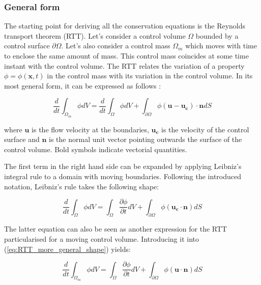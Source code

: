 \subsubsection*{General form}

The starting point for deriving all the conservation equations is the Reynolds transport theorem (RTT). Let's consider a control volume $\Omega$ bounded by a control surface $\partial \Omega$. Let's also consider a control mass $\Omega_m$ which moves with time to enclose the same amount of mass. This control mass coincides at some time instant with the control volume. The RTT relates the variation of a property $\phi = \phi \left( \boldsymbol{x}, t \right)$ in the control mass with its variation in the control volume. In its most general form, it can be expressed as follows :

\begin{equation}
\label{eq:RTT_more_general_shape}
\frac{d}{dt} \int_{\Omega_m} \phi  dV =  \frac{ d}{dt} \int_\Omega \phi dV + \int_{\partial \Omega} \phi  \left( \boldsymbol{u} - \boldsymbol{u_c} \right) \cdot \boldsymbol{n}  dS
\end{equation}

where $\boldsymbol{u}$ is the flow velocity at the boundaries, $\boldsymbol{u_c}$ is the velocity of the control surface and $\boldsymbol{n}$ is the normal unit vector pointing outwards the surface of the control volume. Bold symbols indicate vectorial quantities. 

The first term in the right hand side can be expanded by applying Leibniz's integral rule to a domain with moving boundaries. Following the introduced notation, Leibniz's rule takes the following shape:

\begin{equation}
\label{eq:reynolds_transport_theorem_general_controlVolume}
\frac{d}{dt} \int_\Omega \phi dV =  \int_\Omega \frac{\partial \phi}{\partial t} dV + \int_{\partial \Omega} \phi \left( \boldsymbol{u_c} \cdot \boldsymbol{n} \right) dS
\end{equation}

The latter equation can also be seen as another expression for the RTT particularised for a moving control volume. Introducing it into (\ref{eq:RTT_more_general_shape}) yields:


\begin{equation}
\label{eq:reynolds_transport_theorem_general_controlMass}
\boxed{
\frac{d}{dt} \int_{\Omega_m} \phi  dV = \int_\Omega \frac{\partial \phi}{\partial t} dV + \int_{\partial \Omega} \phi   \left( \boldsymbol{u} \cdot \boldsymbol{n} \right) dS
}
\end{equation}

